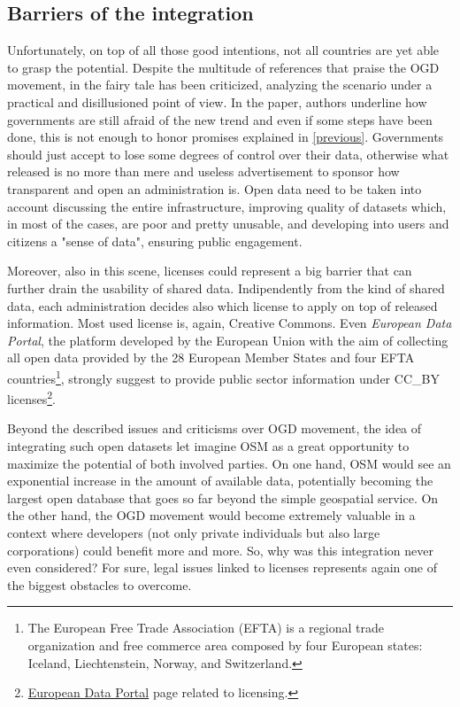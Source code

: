 \subsection{Barriers of the integration}
Unfortunately, on top of all those good intentions, not all countries are yet able to grasp the potential.
Despite the multitude of references that praise the OGD movement, in \cite{janssen2012benefits} the fairy tale has been criticized, analyzing the scenario under a practical and disillusioned point of view. In the paper, authors underline how governments are still afraid of the new trend and even if some steps have been done, this is not enough to honor promises explained in \ref{previous}. Governments should just accept to lose some degrees of control over their data, otherwise what released is no more than mere and useless advertisement to sponsor how transparent and open an administration is. Open data need to be taken into account discussing the entire infrastructure, improving quality of datasets which, in most of the cases, are poor and pretty unusable, and developing into users and citizens a "sense of data", ensuring public engagement.

Moreover, also in this scene, licenses could represent a big barrier that can further drain the usability of shared data.
Indipendently from the kind of shared data, each administration decides also which license to apply on top of released information.
Most used license is, again, Creative Commons. Even \textit{European Data Portal}, the platform developed by the European Union with the aim of collecting all open data provided by the 28 European Member States and four EFTA countries\footnote{The European Free Trade Association (EFTA) is a regional trade organization and free commerce area composed by four European states: Iceland, Liechtenstein, Norway, and Switzerland.}, strongly suggest to provide public sector information under CC\_BY licenses\footnote{\href{https://www.europeandataportal.eu/elearning/en/module4/#/id/co-01}{European Data Portal} page related to licensing.}.

Beyond the described issues and criticisms over OGD movement, the idea of integrating such open datasets let imagine OSM as a great opportunity to maximize the potential of both involved parties.
On one hand, OSM would see an exponential increase in the amount of available data, potentially becoming the largest open database that goes so far beyond the simple geospatial service. On the other hand, the OGD movement would become extremely valuable in a context where developers (not only private individuals but also large corporations) could benefit more and more.
So, why was this integration never even considered? For sure, legal issues linked to licenses represents again one of the biggest obstacles to overcome.

